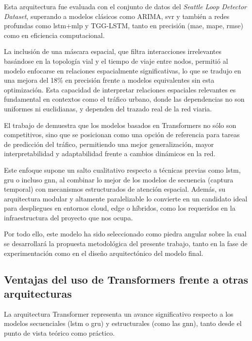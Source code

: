 Esta arquitectura fue evaluada con el conjunto de datos del \textit{Seattle Loop Detector Dataset}, superando a modelos clásicos como ARIMA, \acrshort{svr} y también a redes profundas como \acrshort{lstm}+\acrshort{mlp} y TGG-LSTM, tanto en precisión (\acrshort{mae}, \acrshort{mape}, \acrshort{rmse}) como en eficiencia computacional.

La inclusión de una máscara espacial, que filtra interacciones irrelevantes basándose en la topología vial y el tiempo de viaje entre nodos, permitió al modelo enfocarse en relaciones espacialmente significativas, lo que se tradujo en una mejora del 18\% en precisión frente a modelos equivalentes sin esta optimización. Esta capacidad de interpretar relaciones espaciales relevantes es fundamental en contextos como el tráfico urbano, donde las dependencias no son uniformes ni euclidianas, y dependen del trazado real de la red viaria.

\vspace{0.5cm}

El trabajo de \cite{trafficformer} demuestra que los modelos basados en Transformers no sólo son competitivos, sino que se posicionan como una opción de referencia para tareas de predicción del tráfico, permitiendo una mejor generalización, mayor interpretabilidad y adaptabilidad frente a cambios dinámicos en la red.

Este enfoque supone un salto cualitativo respecto a técnicas previas como \acrshort{lstm}, \acrshort{gru} o incluso \acrshort{gnn}, al combinar lo mejor de los modelos de secuencia (captura temporal) con mecanismos estructurados de atención espacial. Además, su arquitectura modular y altamente paralelizable lo convierte en un candidato ideal para despliegues en entornos cloud, edge o híbridos, como los requeridos en la infraestructura del proyecto que nos ocupa.

Por todo ello, este modelo ha sido seleccionado como piedra angular sobre la cual se desarrollará la propuesta metodológica del presente trabajo, tanto en la fase de experimentación como en el diseño arquitectónico del modelo final.

\subsection{Ventajas del uso de Transformers frente a otras arquitecturas}

La arquitectura Transformer representa un avance significativo respecto a los modelos secuenciales (\acrshort{lstm} o \acrshort{gru}) y estructurales (como las \acrshort{gnn}), tanto desde el punto de vista teórico como práctico.

